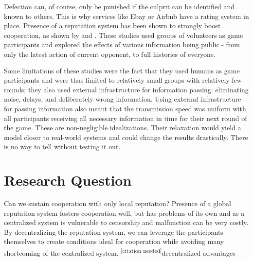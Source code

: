 \documentclass[english]{article}
\newcommand{\citationneeded}{\textsuperscript{\color{blue} [citation needed]}}
\begin{document}
Defection can, of course, only be punished if the culprit can be identified and known to others. This is why services like Ebay or Airbnb have a rating system in place.
Presence of a reputation system has been shown to strongly boost cooperation, as shown by \citet{simple-reputation} and \citet{public-private-monitoring}.
These studies used groups of volunteers as game participants and explored the effects of various information being public - from only the latest action of current opponent, to full histories of everyone.

Some limitations of these studies were the fact that they used humans as game participants and were thus limited to relatively small groups with relatively few rounds; they also used external infrastructure for information passing: eliminating noise, delays, and deliberately wrong information.
Using external infrastructure for passing information also meant that the transmission speed was uniform with all participants receiving all necessary information in time for their next round of the game.
These are non-negligible idealizations. Their relaxation would yield a model closer to real-world systems and could change the results drastically.
There is no way to tell without testing it out.



\section*{Research Question}
Can we sustain cooperation with only local reputation?
Presence of a global reputation system fosters cooperation well, but has problems of its own and as a centralized system is vulnerable to censorship and malfunction can be very costly.
By decentralizing the reputation system, we can leverage the participants themselves to create conditions ideal for cooperation while avoiding many shortcoming of the centralized system. \citationneeded{decentralized advantages}
\end{document}
